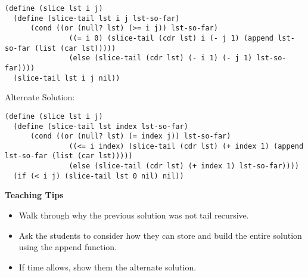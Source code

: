 \begin{blocksection}
\begin{solution}
\begin{lstlisting}
(define (slice lst i j)
  (define (slice-tail lst i j lst-so-far)
      (cond ((or (null? lst) (>= i j)) lst-so-far)
               ((= i 0) (slice-tail (cdr lst) i (- j 1) (append lst-so-far (list (car lst)))))
               (else (slice-tail (cdr lst) (- i 1) (- j 1) lst-so-far))))
  (slice-tail lst i j nil))
\end{lstlisting}
Alternate Solution:
\begin{lstlisting}
(define (slice lst i j)
  (define (slice-tail lst index lst-so-far)
      (cond ((or (null? lst) (= index j)) lst-so-far)
               ((<= i index) (slice-tail (cdr lst) (+ index 1) (append lst-so-far (list (car lst)))))
               (else (slice-tail (cdr lst) (+ index 1) lst-so-far))))
  (if (< i j) (slice-tail lst 0 nil) nil))
\end{lstlisting}
\end{solution}

\end{blocksection}


\begin{blocksection}
\begin{guide}
\textbf{Teaching Tips}
\begin{itemize}
	\item Walk through why the previous solution was not tail recursive.
	\item Ask the students to consider how they can store and build the entire solution using the append function.
	\item If time allows, show them the alternate solution.
\end{itemize}
\end{guide}
\end{blocksection}